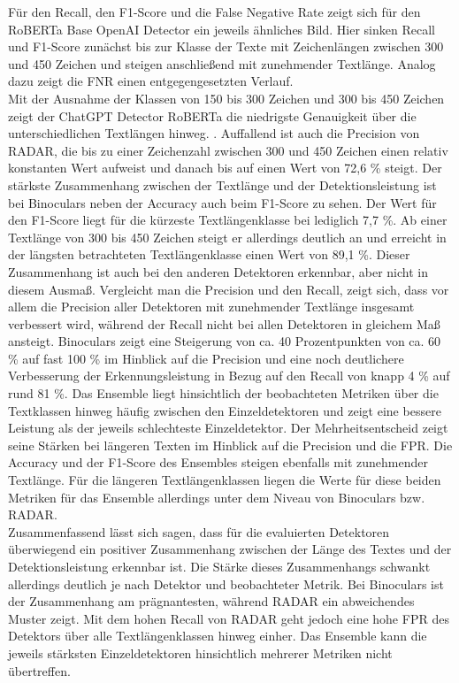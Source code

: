Für den Recall, den F1-Score und die False Negative Rate zeigt sich für den RoBERTa Base OpenAI Detector ein jeweils ähnliches Bild. Hier sinken Recall und F1-Score zunächst bis zur Klasse der Texte mit Zeichenlängen zwischen 300 und 450 Zeichen und steigen anschließend mit zunehmender Textlänge. Analog dazu zeigt die FNR einen entgegengesetzten Verlauf. \\
Mit der Ausnahme der Klassen von 150 bis 300 Zeichen und 300 bis 450 Zeichen zeigt der ChatGPT Detector RoBERTa die niedrigste Genauigkeit über die unterschiedlichen Textlängen hinweg. . Auffallend ist auch die Precision von RADAR, die bis zu einer Zeichenzahl zwischen 300 und 450 Zeichen einen relativ konstanten Wert aufweist und danach bis auf einen Wert von 72,6 \% steigt.
Der stärkste Zusammenhang zwischen der Textlänge und der Detektionsleistung ist bei Binoculars neben der Accuracy auch beim F1-Score zu sehen. Der Wert für den F1-Score liegt für die kürzeste Textlängenklasse bei lediglich 7,7 \%. Ab einer Textlänge von 300 bis 450 Zeichen steigt er allerdings deutlich an und erreicht in der längsten betrachteten Textlängenklasse einen Wert von 89,1 \%. Dieser Zusammenhang ist auch bei den anderen Detektoren erkennbar, aber nicht in diesem Ausmaß. Vergleicht man die Precision und den Recall, zeigt sich, dass vor allem die Precision aller Detektoren mit zunehmender Textlänge insgesamt verbessert wird, während der Recall nicht bei allen Detektoren in gleichem Maß ansteigt. Binoculars zeigt eine Steigerung von ca. 40 Prozentpunkten von ca. 60 \% auf fast 100 \% im Hinblick auf die Precision und eine noch deutlichere Verbesserung der Erkennungsleistung in Bezug auf den Recall von knapp 4 \% auf rund 81 \%.
Das Ensemble liegt hinsichtlich der beobachteten Metriken über die Textklassen hinweg häufig zwischen den Einzeldetektoren und zeigt eine bessere Leistung als der jeweils schlechteste Einzeldetektor. Der Mehrheitsentscheid zeigt seine Stärken bei längeren Texten im Hinblick auf die Precision und die FPR. Die Accuracy und der F1-Score des Ensembles steigen ebenfalls mit zunehmender Textlänge. Für die längeren Textlängenklassen liegen die Werte für diese beiden Metriken für das Ensemble allerdings unter dem Niveau von Binoculars bzw. RADAR. \\
Zusammenfassend lässt sich sagen, dass für die evaluierten Detektoren überwiegend ein positiver Zusammenhang zwischen der Länge des Textes und der Detektionsleistung erkennbar ist. Die Stärke dieses Zusammenhangs schwankt allerdings deutlich je nach Detektor und beobachteter Metrik. Bei Binoculars ist der Zusammenhang am prägnantesten, während RADAR ein abweichendes Muster zeigt. Mit dem hohen Recall von RADAR geht jedoch eine hohe FPR des Detektors über alle Textlängenklassen hinweg einher. Das Ensemble kann die jeweils stärksten Einzeldetektoren hinsichtlich mehrerer Metriken nicht übertreffen.
